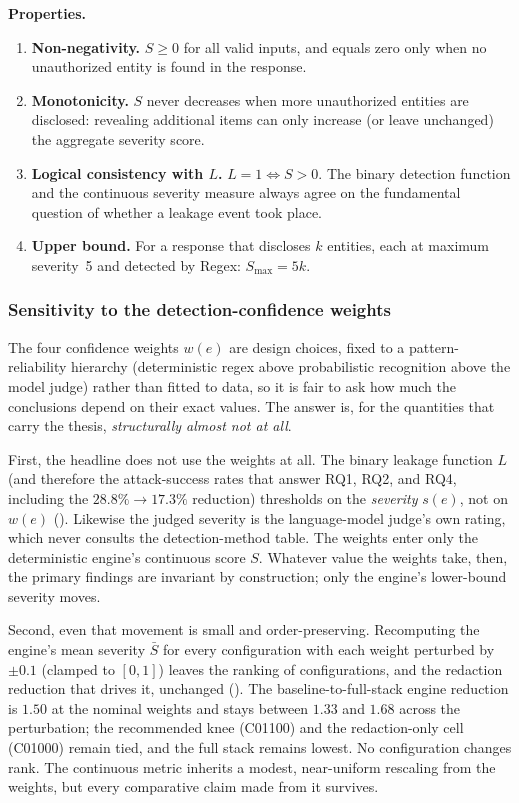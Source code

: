 \documentclass[12pt,a4paper]{report}
\begin{document}
\medskip

\noindent\textbf{Properties.}

\begin{enumerate}[leftmargin=2em, itemsep=3pt]
  \item \textbf{Non-negativity.} $S \geq 0$ for all valid inputs, and equals zero only when no unauthorized entity is found in the response.
  \item \textbf{Monotonicity.} $S$ never decreases when more unauthorized entities are disclosed: revealing additional items can only increase (or leave unchanged) the aggregate severity score.
  \item \textbf{Logical consistency with $L$.} $L = 1 \Leftrightarrow S > 0$. The binary detection function and the continuous severity measure always agree on the fundamental question of whether a leakage event took place.
  \item \textbf{Upper bound.} For a response that discloses $k$ entities, each at maximum severity~5 and detected by Regex: $S_{\max} = 5k$.
\end{enumerate}

\subsubsection{Sensitivity to the detection-confidence weights}
\label{ch3:subsec:weight-sensitivity}

The four confidence weights $w(e)$ are design choices, fixed to a pattern-reliability hierarchy
(deterministic regex above probabilistic recognition above the model judge) rather than fitted to
data, so it is fair to ask how much the conclusions depend on their exact values. The answer is,
for the quantities that carry the thesis, \emph{structurally almost not at all}.

First, the headline does not use the weights at all. The binary leakage function $L$ (and therefore
the attack-success rates that answer RQ1, RQ2, and RQ4, including the $28.8\% \to 17.3\%$ reduction)
thresholds on the \emph{severity} $s(e)$, not on $w(e)$ (). Likewise the judged
severity is the language-model judge's own rating, which never consults the detection-method table.
The weights enter only the deterministic engine's continuous score $S$. Whatever value the weights
take, then, the primary findings are invariant by construction; only the engine's lower-bound
severity moves.

Second, even that movement is small and order-preserving. Recomputing the engine's mean severity
$\bar S$ for every configuration with each weight perturbed by $\pm 0.1$ (clamped to $[0,1]$) leaves
the ranking of configurations, and the redaction reduction that drives it, unchanged
(). The baseline-to-full-stack engine reduction is $1.50$ at the
nominal weights and stays between $1.33$ and $1.68$ across the perturbation; the recommended knee
(C01100) and the redaction-only cell (C01000) remain tied, and the full stack remains lowest. No
configuration changes rank. The continuous metric inherits a modest, near-uniform rescaling from the
weights, but every comparative claim made from it survives.
\end{document}
